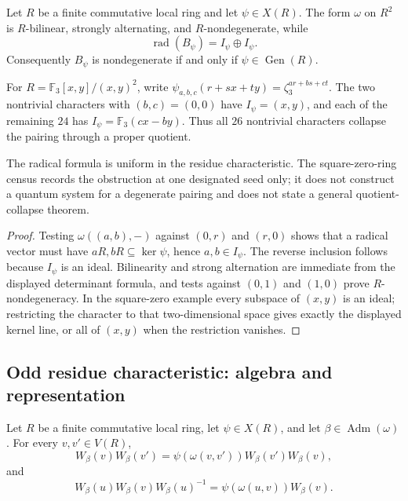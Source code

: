 \statusProved
\begin{theorem}
\label{thm:local-phase-radical}
Let $R$ be a finite commutative local ring and let $\psi\in X(R)$.  The form
$\omega$ on $R^2$ is $R$-bilinear, strongly alternating, and
$R$-nondegenerate, while
\[
 \operatorname{rad}(B_\psi)=I_\psi\oplus I_\psi.
\]
Consequently $B_\psi$ is nondegenerate if and only if
$\psi\in\operatorname{Gen}(R)$.

For
$R=\mathbb F_3[x,y]/(x,y)^2$, write
$\psi_{a,b,c}(r+sx+ty)=\zeta_3^{ar+bs+ct}$.  The two nontrivial characters
with $(b,c)=(0,0)$ have $I_\psi=(x,y)$, and each of the remaining $24$ has
$I_\psi=\mathbb F_3(cx-by)$.  Thus all $26$ nontrivial characters collapse
the pairing through a proper quotient.
\end{theorem}

\begin{scope}
The radical formula is uniform in the residue characteristic.  The
square-zero-ring census records the obstruction at one designated seed only;
it does not construct a quantum system for a degenerate pairing and does not
state a general quotient-collapse theorem.
\end{scope}


\begin{proof}
Testing $\omega((a,b),-)$ against $(0,r)$ and $(r,0)$ shows that a radical
vector must have $aR,bR\subseteq\ker\psi$, hence $a,b\in I_\psi$.  The reverse
inclusion follows because $I_\psi$ is an ideal.  Bilinearity and strong
alternation are immediate from the displayed determinant formula, and tests
against $(0,1)$ and $(1,0)$ prove $R$-nondegeneracy.  In the square-zero
example every subspace of $(x,y)$ is an ideal; restricting the character to
that two-dimensional space gives exactly the displayed kernel line, or all
of $(x,y)$ when the restriction vanishes.
\end{proof}

\subsection{Odd residue characteristic: algebra and representation}

\statusProved
\begin{theorem}
\label{thm:local-weyl-commutation}
Let $R$ be a finite commutative local ring, let $\psi\in X(R)$, and let
$\beta\in\operatorname{Adm}(\omega)$.  For every $v,v'\in V(R)$,
\[
 W_\beta(v)W_\beta(v')
   =\psi(\omega(v,v'))W_\beta(v')W_\beta(v),
\]
and
\[
 W_\beta(u)W_\beta(v)W_\beta(u)^{-1}
   =\psi(\omega(u,v))W_\beta(v).
\]
\end{theorem}

